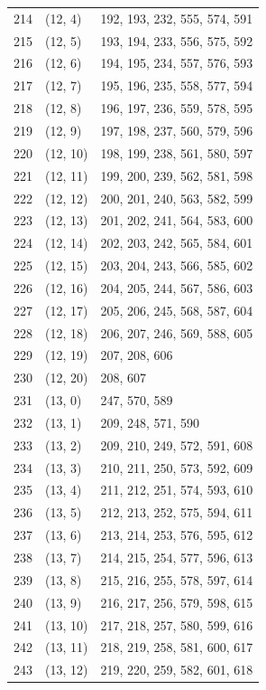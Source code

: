 \documentclass{article}
\begin{document}
\begin{longtable}{lll}
  214 & (12, 4) & 192, 193, 232, 555, 574, 591 \\
  215 & (12, 5) & 193, 194, 233, 556, 575, 592 \\
  216 & (12, 6) & 194, 195, 234, 557, 576, 593 \\
  217 & (12, 7) & 195, 196, 235, 558, 577, 594 \\
  218 & (12, 8) & 196, 197, 236, 559, 578, 595 \\
  219 & (12, 9) & 197, 198, 237, 560, 579, 596 \\
  220 & (12, 10) & 198, 199, 238, 561, 580, 597 \\
  221 & (12, 11) & 199, 200, 239, 562, 581, 598 \\
  222 & (12, 12) & 200, 201, 240, 563, 582, 599 \\
  223 & (12, 13) & 201, 202, 241, 564, 583, 600 \\
  224 & (12, 14) & 202, 203, 242, 565, 584, 601 \\
  225 & (12, 15) & 203, 204, 243, 566, 585, 602 \\
  226 & (12, 16) & 204, 205, 244, 567, 586, 603 \\
  227 & (12, 17) & 205, 206, 245, 568, 587, 604 \\
  228 & (12, 18) & 206, 207, 246, 569, 588, 605 \\
  229 & (12, 19) & 207, 208, 606 \\
  230 & (12, 20) & 208, 607 \\
  231 & (13, 0) & 247, 570, 589 \\
  232 & (13, 1) & 209, 248, 571, 590 \\
  233 & (13, 2) & 209, 210, 249, 572, 591, 608 \\
  234 & (13, 3) & 210, 211, 250, 573, 592, 609 \\
  235 & (13, 4) & 211, 212, 251, 574, 593, 610 \\
  236 & (13, 5) & 212, 213, 252, 575, 594, 611 \\
  237 & (13, 6) & 213, 214, 253, 576, 595, 612 \\
  238 & (13, 7) & 214, 215, 254, 577, 596, 613 \\
  239 & (13, 8) & 215, 216, 255, 578, 597, 614 \\
  240 & (13, 9) & 216, 217, 256, 579, 598, 615 \\
  241 & (13, 10) & 217, 218, 257, 580, 599, 616 \\
  242 & (13, 11) & 218, 219, 258, 581, 600, 617 \\
  243 & (13, 12) & 219, 220, 259, 582, 601, 618 \\

\end{longtable}
\end{document}
